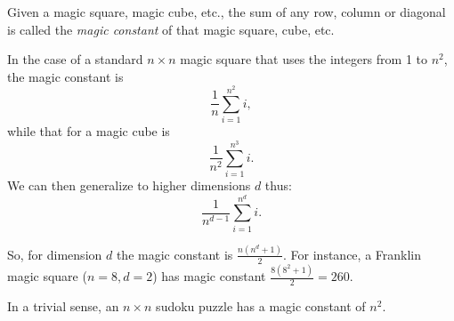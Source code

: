 \documentclass[12pt]{article}
\begin{document}
Given a magic square, magic cube, etc., the sum of any row, column or diagonal is called the \emph{magic constant} of that magic square, cube, etc.

In the case of a standard $n \times n$ magic square that uses the integers from 1 to $n^2$, the magic constant is $$\frac{1}{n}\sum_{i = 1}^{n^2} i,$$ while that for a magic cube is $$\frac{1}{n^2}\sum_{i = 1}^{n^3} i.$$ We can then generalize to higher dimensions $d$ thus: $$\frac{1}{n^{d - 1}}\sum_{i = 1}^{n^d} i.$$

So, for dimension $d$ the magic constant is $\frac{n(n^d + 1)}{2}$. For instance, a Franklin magic square ($n = 8,d = 2$) has magic constant $\frac{8(8^2 + 1)}{2} = 260$.

In a trivial sense, an $n \times n$ sudoku puzzle has a magic constant of $n^2$.
\end{document}
